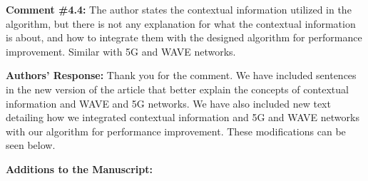 \begin{mdframed}[style=review] 
\textbf{Comment \#4.4:} The author states the contextual information utilized in the algorithm, but there is not any explanation for what the contextual information is about, and how to integrate them with the designed algorithm for performance improvement. Similar with 5G and WAVE networks.
\end{mdframed}

\textbf{Authors' Response:} Thank you for the comment. We have included sentences in the new version of the article that better explain the concepts of contextual information and WAVE and 5G networks. We have also included new text detailing how we integrated contextual information and 5G and WAVE networks with our algorithm for performance improvement. These modifications can be seen below.

\textbf{Additions to the Manuscript:}

